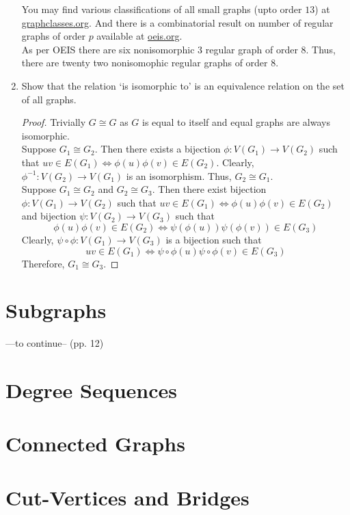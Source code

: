 \begin{enumerate}
\begin{commentary}
	You may find various classifications of all small graphs (upto order $13$) at \href{https://www.graphclasses.org/smallgraphs.html}{graphclasses.org}. And there is a combinatorial result on number of regular graphs of order $p$ available at \href{https://oeis.org/A051031}{oeis.org}.\\

	As per OEIS there are six nonisomorphic $3$ regular graph of order $8$. Thus, there are twenty two nonisomophic regular graphs of order $8$.
\end{commentary}
	\setcounter{enumi}{8}
	\item Show that the relation `is isomorphic to' is an equivalence relation on the set of all graphs.
	\begin{proof}
		Trivially $G \cong G$ as $G$ is equal to itself and equal graphs are always isomorphic.\\

		Suppose $G_1 \cong G_2$. Then there exists a bijection $\phi : V(G_1) \to V(G_2)$ such that $uv \in E(G_1) \iff \phi(u)\phi(v) \in E(G_2)$. Clearly, $\phi^{-1} : V(G_2) \to V(G_1)$ is an isomorphism. Thus, $G_2 \cong G_1$.\\

		Suppose $G_1 \cong G_2$ and $G_2 \cong G_3$.
		Then there exist bijection $\phi : V(G_1) \to V(G_2)$ such that $uv \in E(G_1) \iff \phi(u)\phi(v) \in E(G_2)$ and bijection $\psi : V(G_2) \to V(G_3)$ such that
		$$\phi(u)\phi(v) \in E(G_2) \iff \psi(\phi(u))\psi(\phi(v)) \in E(G_3)$$
		Clearly, $\psi \circ \phi : V(G_1) \to V(G_3)$ is a bijection such that
		$$ uv \in E(G_1) \iff \psi \circ \phi(u) \psi\circ\phi(v) \in E(G_3) $$
		Therefore, $G_1 \cong G_3$.
	\end{proof}
\end{enumerate}
\section{Subgraphs}
---to continue-- (pp. 12)
\section{Degree Sequences}
\section{Connected Graphs}
\section{Cut-Vertices and Bridges}
